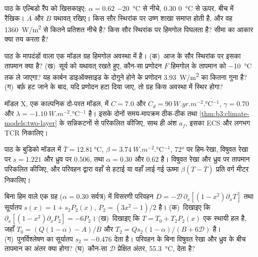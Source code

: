 \begin{exercise}[$\star\star$]\label{exo:b3:climate-models:6}
पाठ के एल्बिडो रैंप को खिसकाइए: $\alpha = 0.62$ \qty{-20}{\celsius} से नीचे,
$0.30$ \qty{0}{\celsius} से ऊपर, बीच में रैखिक। $A$ और $B$ यथावत् रखिए। किस
सौर स्थिरांक पर उष्ण शाखा समाप्त होती है, और वह
\qty{1360}{W/m^2} से कितने प्रतिशत नीचे है? किस सौर स्थिरांक पर हिमगोल पिघलता है?
सीमा का आकार क्या तय करता है?
\end{exercise}

\begin{exercise}[$\star\star$]\label{exo:b3:climate-models:7}
पाठ के मापदंडों वाला एक मॉडल ग्रह हिमगोल अवस्था में है।
(क)~आज के सौर स्थिरांक पर इसका तापमान क्या है? (ख)~सूर्य को यथावत् रखते हुए,
कौन-सा प्रणोदन $F$ हिमगोल के तापमान को
\qty{-10}{\celsius} तक ले जाएगा? यह कार्बन डाइऑक्साइड के दोगुने होने के प्रणोदन
\qty{3.93}{W/m^2} का कितना गुना है? (ग)~बर्फ़ हट जाने के बाद, यदि प्रणोदन हटा दिया
जाए, तो ग्रह किस अवस्था में स्थिर होगा?
\end{exercise}

\begin{exercise}[$\star\star$]\label{exo:b3:climate-models:8}
मॉडल X, एक काल्पनिक दो-परत मॉडल, में $C = 7.0$ और $C_d =
\qty{90}{W.yr.m^{-2}.\celsius^{-1}}$, $\gamma = 0.70$ और $\lambda =
\qty{-1.10}{W.m^{-2}.\celsius^{-1}}$ है। इसके दोनों समय-मापक्रम ठीक-ठीक
तथा \cref{thm:b3:climate-models:two-layer} के सन्निकटनों से परिकलित कीजिए, साथ ही
अंश $a_f$, इसका ECS और लगभग TCR निकालिए।
\end{exercise}

\begin{exercise}[$\star\star$]\label{exo:b3:climate-models:9}
पाठ के बुडिको मॉडल में $\bar T = \qty{12.81}{\celsius}$, $\beta =
\qty{3.74}{W.m^{-2}.\celsius^{-1}}$, \ang{72} पर हिम-रेखा, विषुवत रेखा पर $s = 1.221$
और ध्रुव पर $0.506$, तथा $\alpha = 0.30$ और $0.62$ है।
विषुवत रेखा और ध्रुव पर तापमान परिकलित कीजिए, और
परिवहन द्वारा वहाँ से हटाई या वहाँ लाई गई ऊष्मा $\beta(T - \bar T)$
प्रति वर्ग मीटर निकालिए।
\end{exercise}

\begin{exercise}[$\star\star\star$]\label{exo:b3:climate-models:10}
बिना हिम वाले एक ग्रह ($\alpha = 0.30$ सर्वत्र) में विसरणी परिवहन
$D = -\mathcal D\,\partial_x[(1 - x^2)\partial_xT]$ तथा सूर्यातप
$s(x) = 1 + s_2P_2(x)$, $P_2 = (3x^2 - 1)/2$ है। (क)~दिखाइए कि
$\partial_x[(1 - x^2)\partial_xP_2] = -6P_2$। (ख)~दिखाइए कि $T = T_0 +
T_2P_2(x)$ एक स्थायी हल है, जहाँ $T_0 = (Q(1 - \alpha) - A)/B$ और
$T_2 = Qs_2(1 - \alpha)/(B + 6\mathcal D)$ है। (ग)~पुनर्विश्लेषण का सूर्यातप
$s_2 = \num{-0.476}$ देता है। परिवहन के बिना विषुवत रेखा और ध्रुव के बीच
तापमान का अंतर क्या होगा? (घ)~कौन-सा $\mathcal D$ प्रेक्षित
अंतर, \qty{55.3}{\celsius}, देता है?
\end{exercise}

